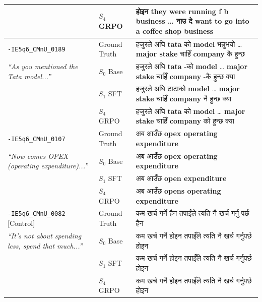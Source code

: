 \documentclass[10pt,twocolumn,a4paper]{article}
\newcommand{\dev}[1]{{\devfont #1}}
\newcommand{\sys}[1]{$S_{#1}$}
\begin{document}
\begin{table}[H]
\begin{tabularx}{\textwidth}{@{} >{\raggedright\arraybackslash}p{3.4cm} l X@{}}
& \sys{4} GRPO & \dev{होइन} \textbf{they were running f b business \dots} \dev{नाउ दे} \textbf{want to go into a coffee shop business} \\
\midrule
\texttt{-IE5q6\_CMnU\_0189} & Ground Truth & \dev{हजुरले अघि} \textbf{tata} \dev{को} \textbf{model} \dev{भन्नुभयो \dots} \textbf{major stake} \dev{चाहिँ} \textbf{company} \dev{कै हुन्छ} \\
\textit{``As you mentioned the Tata model...''} & \sys{0} Base & \dev{हजुरले अघि} \textbf{tata} \dev{-को} \textbf{model} \dev{\dots} \textbf{major stake} \dev{चाहिँ} \textbf{company} \dev{-कै हुन्छ क्या} \\
& \sys{1} SFT & \dev{हजुरले अघि} \dev{टाटाको} \textbf{model} \dev{\dots} \textbf{major stake} \dev{चाहिँ} \textbf{company} \dev{नै हुन्छ क्या} \\
& \sys{4} GRPO & \dev{हजुरले अघि} \textbf{tata} \dev{को} \textbf{model} \dev{\dots} \textbf{major stake} \dev{चाहिँ} \textbf{company} \dev{को हुन्छ क्या} \\
\midrule
\texttt{-IE5q6\_CMnU\_0107} & Ground Truth & \dev{अब आउँछ} \textbf{opex operating expenditure} \\
\textit{``Now comes OPEX (operating expenditure)...''} & \sys{0} Base & \dev{अब आउँछ} \textbf{opex operating expenditure} \\
& \sys{1} SFT & \dev{अब आउँछ} \textbf{open expenditure} \\
& \sys{4} GRPO & \dev{अब आउँछ} \textbf{opens operating expenditure} \\
\midrule
\texttt{-IE5q6\_CMnU\_0082} [Control] & Ground Truth & \dev{कम खर्च गर्ने हैन तपाईंले त्यति नै खर्च गर्नु पर्छ हैन} \\
\textit{``It's not about spending less, spend that much...''} & \sys{0} Base & \dev{कम खर्च गर्ने होइन तपाईँले त्यति नै खर्च गर्नुपर्छ होइन} \\
& \sys{1} SFT & \dev{कम खर्च गर्ने होइन तपाईँले त्यति नै खर्च गर्नुपर्छ होइन} \\
& \sys{4} GRPO & \dev{कम खर्च गर्ने होइन तपाईँले त्यति नै खर्च गर्नुपर्छ होइन} \\
\bottomrule
\end{tabularx}
\end{table}
\end{document}
